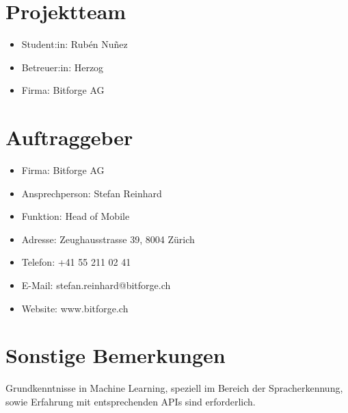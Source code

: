\documentclass[11pt,a4paper]{article}
\begin{document}
\section*{Projektteam}
\begin{itemize}
	\item Student:in: Rubén Nuñez
	\item Betreuer:in: Herzog
	\item Firma: Bitforge AG
\end{itemize}

\section*{Auftraggeber}
\begin{itemize}
	\item Firma: Bitforge AG
	\item Ansprechperson: Stefan Reinhard
	\item Funktion: Head of Mobile
	\item Adresse: Zeughausstrasse 39, 8004 Zürich
	\item Telefon: +41 55 211 02 41
	\item E-Mail: stefan.reinhard@bitforge.ch
	\item Website: www.bitforge.ch
\end{itemize}

\section*{Sonstige Bemerkungen}
Grundkenntnisse in Machine Learning, speziell im Bereich der Spracherkennung, sowie
Erfahrung mit entsprechenden APIs sind erforderlich.
\end{document}
